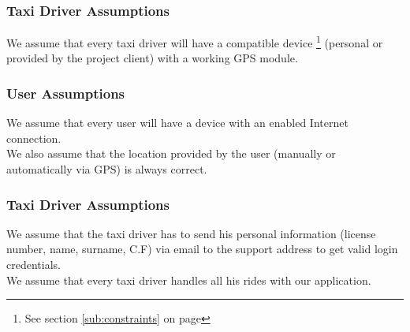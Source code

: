 \subsubsection{Taxi Driver Assumptions} 
We assume that every taxi driver will have a compatible device  \footnote{See section \ref{sub:constraints} on page \pageref{sub:constraints}} (personal or provided by the project client) with a working GPS module.
\subsubsection{User Assumptions} 
\label{ssub:user_assumptions}
We assume that every user will have a device with an enabled Internet connection.\\
We also assume that the location provided by the user (manually or automatically via GPS) is always correct.
\subsubsection{Taxi Driver Assumptions} 
\label{ssub:driver_assumptions}
We assume that the taxi driver has to send his personal information (license number, name, surname, C.F) via email to the support address to get valid login credentials.\\
We assume that every taxi driver handles all his rides with our application.

